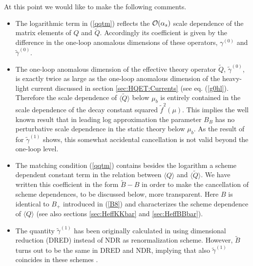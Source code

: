 At this point we would like to make the following comments.
\begin{itemize}
\item
The logarithmic term in (\ref{qqtm}) reflects the ${\cal O}(\alpha_s)$
scale dependence of the matrix elements of $Q$ and
$\tilde Q$. Accordingly its coefficient is given by
the difference in the one-loop anomalous dimensions of these operators,
$\gamma^{(0)}$ and $\tilde\gamma^{(0)}$.
\item
The one-loop anomalous dimension of the effective theory operator
$\tilde Q$, $\tilde\gamma^{(0)}$, is exactly twice as large as the
one-loop anomalous dimension of the heavy-light current discussed in
section \ref{sec:HQET:Currents} (see eq. (\ref{g0hl}). Therefore the
scale dependence of $\langle\tilde Q\rangle$ below $\mu_b$ is entirely
contained in the scale dependence of the decay constant squared
$\tilde f^2(\mu)$. This implies the well known result that in leading log
approximation the parameter $B_B$ has no perturbative scale
dependence in the static theory below $\mu_b$. As the result of
\cite{gimenez:93} for $\tilde\gamma^{(1)}$ shows, this somewhat accidental
cancellation is not valid beyond the one-loop level.
\item
The matching condition (\ref{qqtm}) contains besides the logarithm
a scheme dependent constant term in the relation between
$\langle Q\rangle$ and $\langle\tilde Q\rangle$. We have written this
coefficient in the form $\tilde B-B$ in order to make the
cancellation of scheme dependences, to be discussed below, more
transparent. Here $B$ is identical to $B_+$ introduced in (\ref{B8})
and characterizes the scheme dependence of $\langle Q\rangle$ 
(see also sections \ref{sec:HeffKKbar} and \ref{sec:HeffBBbar}).
\item
The quantity $\tilde\gamma^{(1)}$ has been originally calculated in
\cite{gimenez:93} using dimensional reduction (DRED) instead of NDR as
renormalization scheme. However, $\tilde B$ turns out to be the same in
DRED and NDR, implying that also $\tilde\gamma^{(1)}$ coincides in
these schemes \cite{gimenez:93}.
\end{itemize}

